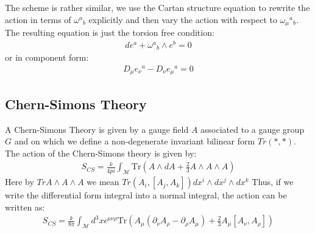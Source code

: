The scheme is rather similar, we use the Cartan structure equation to
rewrite the action in terms of $ \omega^a{}_b $ explicitly and then
vary the action with respect to $ \omega_\mu{}^a{}_b $. The resulting
equation is just the torsion free condition:
\begin{align}
  de^a + \omega^a{}_b \wedge e^b = 0
\end{align}
or in component form:
\begin{align}\label{eq:torsionfree}
  D_\mu e_\nu{}^a - D_\nu e_\mu{}^a = 0
\end{align}

\subsection{Chern-Simons Theory}

A Chern-Simons Theory is given by a gauge field $ A $ associated to a
gauge group $ G $ and on which we define a non-degenerate invariant
bilinear form $ Tr( *, *) $. The action of the Chern-Simons theory is given by:
\begin{align}
  S_{CS} = \displaystyle\frac{k}{4 pi} \int_{\mathcal{M}}
  \mathrm{Tr}\left( A \wedge dA + \frac{2}{3} A
  \wedge A \wedge A \right)
\end{align}
Here by $ Tr A \wedge A \wedge A $ we mean $ Tr(A_i, [A_j,
A_k]) dx^i \wedge dx^j \wedge dx^k  $ Thus, if we write the
differential form integral into
a normal integral, the action can be written as:
\begin{align}
  S_{CS} = \displaystyle\frac{k}{8 \pi} \int_{\mathcal{M}} d^3x
  \epsilon^{\mu\nu\rho}
  \mathrm{Tr}\left( A_\mu
    (\partial_\nu A_\rho - \partial_{\rho} A_\mu ) + \frac{2}{3} A_\mu
  [A_\nu, A_\rho] \right)
\end{align}


